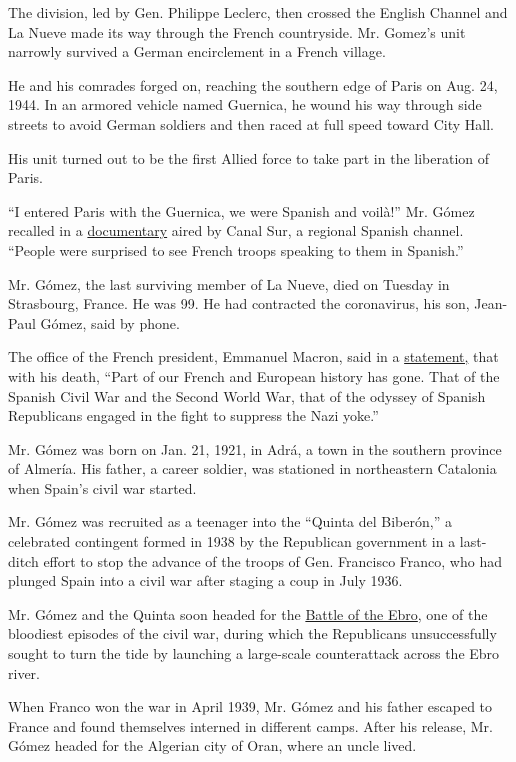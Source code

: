 The division, led by Gen. Philippe Leclerc, then crossed the English
Channel and La Nueve made its way through the French countryside. Mr.
Gomez's unit narrowly survived a German encirclement in a French
village.

He and his comrades forged on, reaching the southern edge of Paris on
Aug. 24, 1944. In an armored vehicle named Guernica, he wound his way
through side streets to avoid German soldiers and then raced at full
speed toward City Hall.

His unit turned out to be the first Allied force to take part in the
liberation of Paris.

``I entered Paris with the Guernica, we were Spanish and voilà!'' Mr.
Gómez recalled in a
\href{http://www.canalsur.es/multimedia.html?id=1571558\&jwsource=cl}{documentary}
aired by Canal Sur, a regional Spanish channel. ``People were surprised
to see French troops speaking to them in Spanish.''

Mr. Gómez, the last surviving member of La Nueve, died on Tuesday in
Strasbourg, France. He was 99. He had contracted the coronavirus, his
son, Jean-Paul Gómez, said by phone.

The office of the French president, Emmanuel Macron, said in a
\href{https://www.elysee.fr/emmanuel-macron/2020/04/01/deces-de-rafael-gomez-nieto}{statement,}
that with his death, ``Part of our French and European history has gone.
That of the Spanish Civil War and the Second World War, that of the
odyssey of Spanish Republicans engaged in the fight to suppress the Nazi
yoke.''

Mr. Gómez was born on Jan. 21, 1921, in Adrá, a town in the southern
province of Almería. His father, a career soldier, was stationed in
northeastern Catalonia when Spain's civil war started.

Mr. Gómez was recruited as a teenager into the ``Quinta del Biberón,'' a
celebrated contingent formed in 1938 by the Republican government in a
last-ditch effort to stop the advance of the troops of Gen. Francisco
Franco, who had plunged Spain into a civil war after staging a coup in
July 1936.

Mr. Gómez and the Quinta soon headed for the
\href{https://thespanishcivilwar.com/events-and-battles/battle-of-the-ebro/}{Battle
of the Ebro}, one of the bloodiest episodes of the civil war, during
which the Republicans unsuccessfully sought to turn the tide by
launching a large-scale counterattack across the Ebro river.

When Franco won the war in April 1939, Mr. Gómez and his father escaped
to France and found themselves interned in different camps. After his
release, Mr. Gómez headed for the Algerian city of Oran, where an uncle
lived.

